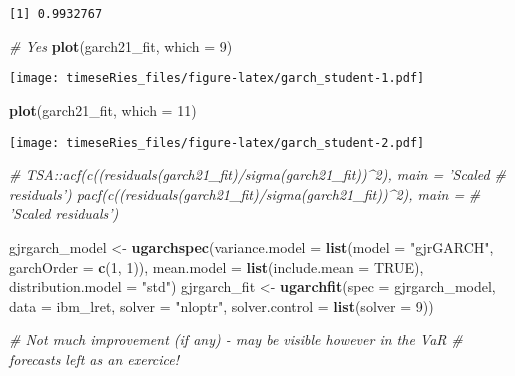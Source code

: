 \documentclass[]{book}
\newenvironment{Shaded}{\begin{snugshade}}{\end{snugshade}}
\newcommand{\CommentTok}[1]{\textcolor[rgb]{0.56,0.35,0.01}{\textit{#1}}}
\newcommand{\DataTypeTok}[1]{\textcolor[rgb]{0.13,0.29,0.53}{#1}}
\newcommand{\DecValTok}[1]{\textcolor[rgb]{0.00,0.00,0.81}{#1}}
\newcommand{\KeywordTok}[1]{\textcolor[rgb]{0.13,0.29,0.53}{\textbf{#1}}}
\newcommand{\NormalTok}[1]{#1}
\newcommand{\OtherTok}[1]{\textcolor[rgb]{0.56,0.35,0.01}{#1}}
\newcommand{\StringTok}[1]{\textcolor[rgb]{0.31,0.60,0.02}{#1}}
\begin{document}
\begin{verbatim}
[1] 0.9932767
\end{verbatim}

\begin{Shaded}
\begin{Highlighting}[]
\CommentTok{# Yes}
\KeywordTok{plot}\NormalTok{(garch21_fit, }\DataTypeTok{which =} \DecValTok{9}\NormalTok{)}
\end{Highlighting}
\end{Shaded}

\texttt{[image: timeseRies\_files/figure-latex/garch\_student-1.pdf]}

\begin{Shaded}
\begin{Highlighting}[]
\KeywordTok{plot}\NormalTok{(garch21_fit, }\DataTypeTok{which =} \DecValTok{11}\NormalTok{)}
\end{Highlighting}
\end{Shaded}

\texttt{[image: timeseRies\_files/figure-latex/garch\_student-2.pdf]}

\begin{Shaded}
\begin{Highlighting}[]
\CommentTok{# TSA::acf(c((residuals(garch21_fit)/sigma(garch21_fit))^2), main = 'Scaled}
\CommentTok{# residuals') pacf(c((residuals(garch21_fit)/sigma(garch21_fit))^2), main =}
\CommentTok{# 'Scaled residuals')}

\NormalTok{gjrgarch_model <-}\StringTok{ }\KeywordTok{ugarchspec}\NormalTok{(}\DataTypeTok{variance.model =} \KeywordTok{list}\NormalTok{(}\DataTypeTok{model =} \StringTok{"gjrGARCH"}\NormalTok{, }\DataTypeTok{garchOrder =} \KeywordTok{c}\NormalTok{(}\DecValTok{1}\NormalTok{, }
    \DecValTok{1}\NormalTok{)), }\DataTypeTok{mean.model =} \KeywordTok{list}\NormalTok{(}\DataTypeTok{include.mean =} \OtherTok{TRUE}\NormalTok{), }\DataTypeTok{distribution.model =} \StringTok{"std"}\NormalTok{)}
\NormalTok{gjrgarch_fit <-}\StringTok{ }\KeywordTok{ugarchfit}\NormalTok{(}\DataTypeTok{spec =}\NormalTok{ gjrgarch_model, }\DataTypeTok{data =}\NormalTok{ ibm_lret, }\DataTypeTok{solver =} \StringTok{"nloptr"}\NormalTok{, }
    \DataTypeTok{solver.control =} \KeywordTok{list}\NormalTok{(}\DataTypeTok{solver =} \DecValTok{9}\NormalTok{))}

\CommentTok{# Not much improvement (if any) - may be visible however in the VaR}
\CommentTok{# forecasts left as an exercice!}
\end{Highlighting}
\end{Shaded}
\end{document}

